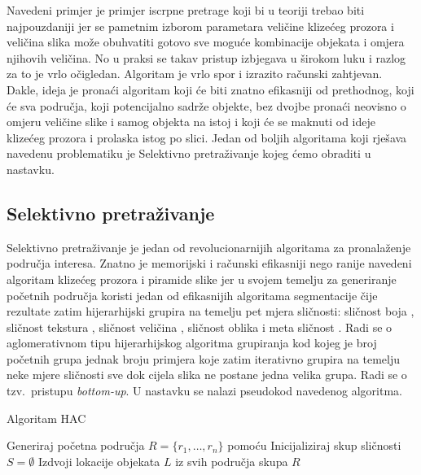 \documentclass[times, utf8, diplomski]{fer}
\begin{document}
Navedeni primjer je primjer iscrpne pretrage  koji bi u teoriji trebao biti najpouzdaniji jer se pametnim izborom parametara veličine klizećeg prozora i veličina slika može obuhvatiti gotovo sve moguće kombinacije objekata i omjera njihovih veličina. No u praksi se takav pristup izbjegava u širokom luku i razlog za to je vrlo očigledan. Algoritam je vrlo spor i izrazito računski zahtjevan. Dakle, ideja je pronaći algoritam koji će biti znatno efikasniji od prethodnog, koji će sva područja, koji potencijalno sadrže objekte, bez dvojbe pronaći neovisno o omjeru veličine slike i samog objekta na istoj i koji će se maknuti od ideje klizećeg prozora i prolaska istog po slici. Jedan od boljih algoritama koji rješava navedenu problematiku je Selektivno pretraživanje kojeg ćemo obraditi u nastavku.

\subsection{Selektivno pretraživanje}
Selektivno pretraživanje  je jedan od revolucionarnijih algoritama za pronalaženje područja interesa. Znatno je memorijski i računski efikasniji nego ranije navedeni algoritam klizećeg prozora i piramide slike jer u svojem temelju za generiranje početnih područja koristi jedan od efikasnijih algoritama segmentacije čije rezultate zatim hijerarhijski grupira na temelju pet mjera sličnosti: sličnost boja , sličnost tekstura , sličnost veličina , sličnost oblika  i meta sličnost . Radi se o aglomerativnom tipu hijerarhijskog algoritma grupiranja  kod kojeg je broj početnih grupa jednak broju primjera koje zatim iterativno grupira na temelju neke mjere sličnosti sve dok cijela slika ne postane jedna velika grupa. Radi se o tzv.\ pristupu \textit{bottom-up}. U nastavku se nalazi pseudokod navedenog algoritma.

\begin{algorithm}[h]
    \caption[Caption for LOF]{Algoritam HAC\footnotemark}
    \label{alg:hac}
    \SetAlgoLined
    \bigskip
    Generiraj početna područja $R = \{r_1, \dots , r_n\}$ pomoću \citep{Felzenszwalb2004}\;
    Inicijaliziraj skup sličnosti $S = \emptyset$\;
    Izdvoji lokacije objekata $L$ iz svih područja skupa $R$\;
\end{algorithm}
\end{document}
